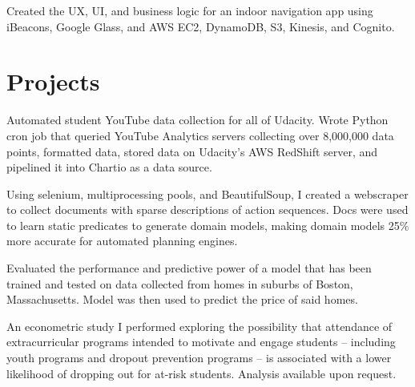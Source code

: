 \documentclass[]{deedy-resume-openfont}
\begin{document}
\begin{minipage}[t]{0.66\textwidth}
\begin{tightemize}
\item Created the UX, UI, and business logic for an indoor navigation app using iBeacons, Google Glass, and AWS EC2, DynamoDB, S3, Kinesis, and Cognito.
\end{tightemize}
\sectionsep

\section{Projects}

\begin{tightemize}
\item Automated student YouTube data collection for all of Udacity. Wrote Python cron job that queried YouTube Analytics servers collecting over 8,000,000 data points, formatted data, stored data on Udacity's AWS RedShift server, and pipelined it into Chartio as a data source.
\end{tightemize}
\sectionsep

\begin{tightemize}
\item Using selenium, multiprocessing pools, and BeautifulSoup, I created a webscraper to collect documents with sparse descriptions of action sequences. Docs were used to learn static predicates to generate domain models, making domain models 25\% more accurate for automated planning engines.
\end{tightemize}
\sectionsep

\begin{tightemize}
\item Evaluated the performance and predictive power of a model that has been trained and tested on data collected from homes in suburbs of Boston, Massachusetts. Model was then used to predict the price of said homes.
\end{tightemize}
\sectionsep

\begin{tightemize}
\item An econometric study I performed exploring the possibility that attendance of extracurricular programs intended to motivate and engage students – including youth programs and dropout prevention programs – is associated with a lower likelihood of dropping out for at-risk students. Analysis available upon request.
\end{tightemize}


\end{minipage}
\end{document}
